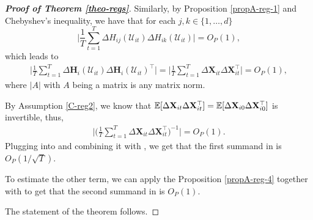\documentclass[a4paper,12pt]{article}
\makeatletter
\renewcommand{\eqref}[1]{\tagform@{\ref{#1}}}
\makeatother
\begin{document}
\begin{proof}[\textnormal{\textbf{Proof of Theorem \ref{theo-regs}}}]
Similarly, by Proposition \ref{propA-reg-1} and Chebyshev's inequality, we have that for each \linebreak $j, k\in\{1, \ldots, d\}$
\[  \Big|\frac{1}{T}\sum_{t=1}^T \Delta H_{ij}(\mathcal{U}_{it}) \Delta H_{ik}(\mathcal{U}_{it})\Big| = O_P(1),
\]
which leads to 
\begin{align*}
\Big| \frac{1}{T}\sum_{t=1}^T \Delta \mathbf{H}_i (\mathcal{U}_{it})\Delta \mathbf{H}_i (\mathcal{U}_{it})^\top \Big| =\Big|\frac{1}{T}\sum_{t=1}^T\Delta \mathbf{X}_{it} \Delta \mathbf{X}_{it}^\top\Big| = O_P(1),
\end{align*}
where $|A|$ with $A$ being a matrix is any matrix norm.

By Assumption \ref{C-reg2}, we know that $\mathbb{E} [\Delta \mathbf{X}_{it} \Delta \mathbf{X}_{it}^\top] = \mathbb{E} [\Delta \mathbf{X}_{i0} \Delta \mathbf{X}_{i0}^\top]$ is invertible, thus, 
\begin{align}\label{theo-regs-proof-7}
\Bigg|  \Big(\frac{1}{T}\sum_{t=1}^T\Delta \mathbf{X}_{it} \Delta \mathbf{X}_{it}^\top\Big)^{-1}\Bigg| = O_P(1).
\end{align}
Plugging \eqref{theo-regs-proof-6} into \eqref{theo-regs-proof-2} and combining it with \eqref{theo-regs-proof-7}, we get that the first  summand in \eqref{theo-regs-proof-1} is $O_P(1/\sqrt{T})$.

To estimate the other term, we can apply the Proposition \ref{propA-reg-4} together with \eqref{theo-regs-proof-7} to get that the second summand in \eqref{theo-regs-proof-1} is $O_P(1)$.

The statement of the theorem follows.
\end{proof}
\end{document}
